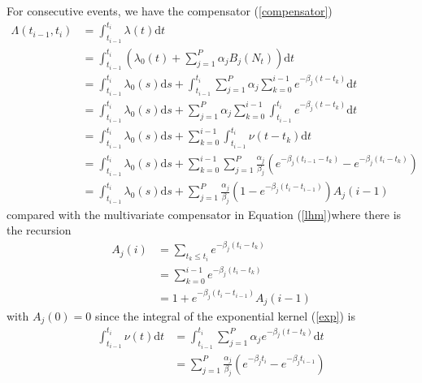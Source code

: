 \documentclass{amsart}
\newcommand{\mathd}{\mathrm{d}}
\begin{document}
For consecutive events, we have the compensator (\ref{compensator})
\begin{equation}
  \begin{array}{ll}
    \Lambda ( t_{i - 1}, t_i) & = \int_{t_{i - 1}}^{t_i} \lambda ( t) \mathd
    t\\
    & = \int_{t_{i - 1}}^{t_i} \left( \lambda_0 ( t) + \sum_{j = 1}^P
    \alpha_j B_j ( N_t) \right) \mathd t\\
    & = \int_{t_{i - 1}^{}}^{t_i} \lambda_0 ( s) \mathd s + \int_{t_{i -
    1}^{}}^{t_i} \sum_{j = 1}^P \alpha_j \sum_{k = 0}^{i - 1} e^{- \beta_j ( t
    - t_k)} \mathd t\\
    & = \int_{t_{i - 1}^{}}^{t_i} \lambda_0 ( s) \mathd s + \sum_{j = 1}^P
    \alpha_j \sum_{k = 0}^{i - 1}  \int_{t_{i - 1}^{}}^{t_i} e^{- \beta_j ( t
    - t_k)} \mathd t\\
    & = \int_{t_{i - 1}^{}}^{t_i} \lambda_0 ( s) \mathd s + \sum_{k = 0}^{i -
    1} \int_{t_{i - 1}}^{t_i} \nu ( t - t_k) \mathd t\\
    & = \int_{t_{i - 1}^{}}^{t_i} \lambda_0 ( s) \mathd s + \sum_{k = 0}^{i -
    1} \sum_{j = 1}^P \frac{\alpha_j}{\beta_j} ( e^{- \beta_j ( t_{i - 1} -
    t_k)} - e^{- \beta_j ( t_i - t_k)})\\
    & = \int_{t_{i - 1}^{}}^{t_i} \lambda_0 ( s) \mathd s + \sum_{j = 1}^P
    \frac{\alpha_j}{\beta_j} ( 1 - e^{- \beta_j ( t_i - t_{i - 1})}) A_j ( i -
    1)
  \end{array} \label{hc}
\end{equation}
compared with the multivariate compensator in Equation (\ref{lhm})where there
is the recursion
\begin{equation}
  \begin{array}{ll}
    A_j ( i) & = \sum_{t_k \leqslant t_i} e^{- \beta_j ( t_i - t_k)}\\
    & = \sum_{k = 0}^{i - 1} e^{- \beta_j ( t_i - t_k)}\\
    & = 1 + e^{- \beta_j ( t_i - t_{i - 1})} A_j ( i - 1)
  \end{array} \label{A}
\end{equation}
with $A_j ( 0) = 0$ since the integral of the exponential kernel (\ref{exp})
is
\begin{equation}
  \begin{array}{ll}
    \int_{t_{i - 1}}^{t_i} \nu ( t) \mathd t & = \int_{t_{i - 1}^{}}^{t_i}
    \sum_{j = 1}^P \alpha_j e^{- \beta_j  ( t - t_k)} \mathd t\\
    & = \sum_{j = 1}^P \frac{\alpha_j}{\beta_j}  ( e^{- \beta_j t_i} - e^{-
    \beta_j t_{i - 1}})
  \end{array}
\end{equation}
\end{document}
